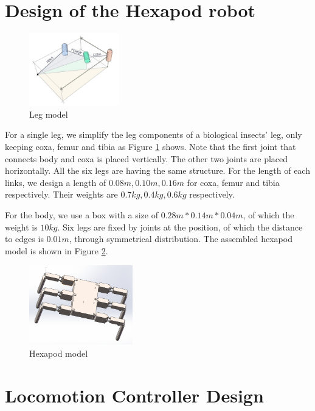 \documentclass[conference]{IEEEtran}
\begin{document}
\section{Design of the Hexapod robot}\label{s3}

\begin{figure}
    \centerline{\includegraphics[width=0.35\textwidth]{single_leg.jpg}}
    \caption{Leg model}
    \label{fig2}
\end{figure}

For a single leg, we simplify the leg components of a biological insects' leg, only keeping coxa, femur and tibia as Figure \ref{fig2} shows. Note that the first joint that connects body and coxa is placed vertically. The other two joints are placed horizontally. All the six legs are having the same structure. For the length of each links, we design a length of \(0.08m, 0.10m, 0.16m\) for coxa, femur and tibia respectively. Their weights are \(0.7kg, 0.4kg, 0.6kg\) respectively.

For the body, we use a box with a size of \(0.28m * 0.14m *0.04m\), of which the weight is \(10kg\). Six legs are fixed by joints at the position, of which the distance to edges is \(0.01m\), through symmetrical distribution. The assembled hexapod model is shown in Figure \ref{fig10}. 

\begin{figure}
    \centerline{\includegraphics[width=0.4\textwidth]{hexapod.png}}
    \caption{Hexapod model}
    \label{fig10}
\end{figure}

\section{Locomotion Controller Design}\label{s4}
\end{document}
